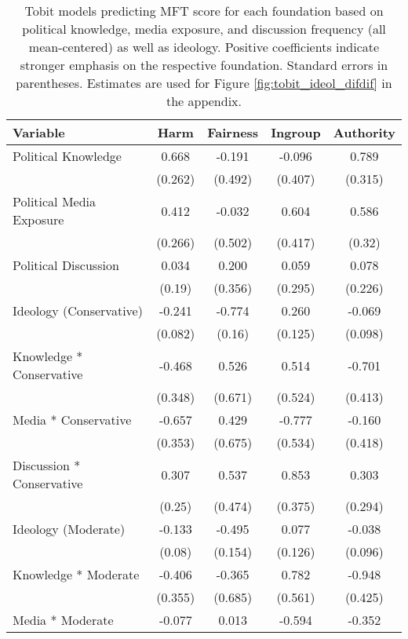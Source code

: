 \begin{table}[ht]
\centering
\caption{Tobit models predicting MFT score for each foundation based 
           on political knowledge, media exposure, and discussion frequency (all mean-centered)
           as well as ideology. Positive coefficients indicate stronger emphasis on the respective
           foundation. Standard errors in parentheses. Estimates are used for Figure
           \ref{fig:tobit_ideol_difdif} in the appendix.} 
\label{tab:tobit_ideol_difdif}
\begingroup\footnotesize
\begin{tabular}{lcccc}
  \hline
Variable & Harm & Fairness & Ingroup & Authority \\ 
  \hline
Political Knowledge &  0.668 & -0.191 & -0.096 &  0.789 \\ 
   & (0.262) & (0.492) & (0.407) & (0.315) \\ 
  Political Media Exposure &  0.412 & -0.032 &  0.604 &  0.586 \\ 
   & (0.266) & (0.502) & (0.417) & (0.32) \\ 
  Political Discussion &  0.034 &  0.200 &  0.059 &  0.078 \\ 
   & (0.19) & (0.356) & (0.295) & (0.226) \\ 
  Ideology (Conservative) & -0.241 & -0.774 &  0.260 & -0.069 \\ 
   & (0.082) & (0.16) & (0.125) & (0.098) \\ 
  Knowledge * Conservative & -0.468 &  0.526 &  0.514 & -0.701 \\ 
   & (0.348) & (0.671) & (0.524) & (0.413) \\ 
  Media * Conservative & -0.657 &  0.429 & -0.777 & -0.160 \\ 
   & (0.353) & (0.675) & (0.534) & (0.418) \\ 
  Discussion * Conservative &  0.307 &  0.537 &  0.853 &  0.303 \\ 
   & (0.25) & (0.474) & (0.375) & (0.294) \\ 
  Ideology (Moderate) & -0.133 & -0.495 &  0.077 & -0.038 \\ 
   & (0.08) & (0.154) & (0.126) & (0.096) \\ 
  Knowledge * Moderate & -0.406 & -0.365 &  0.782 & -0.948 \\ 
   & (0.355) & (0.685) & (0.561) & (0.425) \\ 
  Media * Moderate & -0.077 &  0.013 & -0.594 & -0.352 \\ 

\end{tabular}
\end{table}
